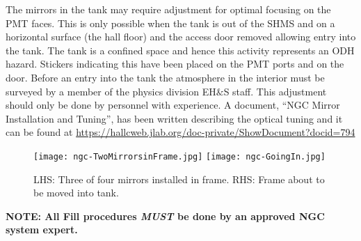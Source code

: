 {The mirrors in the tank may require adjustment for optimal focusing on
the PMT faces. This is only possible when the tank is out of the SHMS
and on a horizontal surface (the hall floor) and the access door
removed allowing entry into the tank. The tank is a confined space and
hence this activity represents an ODH hazard. Stickers indicating this
have been placed on the PMT ports and on the door. Before an entry
into the tank the atmosphere in the interior must be surveyed by a
member of the physics division EH$\&$S staff.  This adjustment should
only be done by personnel with experience. A document, ``NGC Mirror
Installation and Tuning'', has been written describing the optical
tuning and it can be found at
\url{https://hallcweb.jlab.org/doc-private/ShowDocument?docid=794}

\begin{figure}[!h] %
   \centering
   \texttt{[image: ngc-TwoMirrorsinFrame.jpg]}
   \texttt{[image: ngc-GoingIn.jpg]}
   \caption{LHS: Three of four mirrors installed in frame. RHS: Frame
     about to be moved into tank.\label{fig:install}}

\end{figure}


\vspace{.25in}

\textbf{NOTE: All Fill procedures \emph{MUST} be done by an approved NGC system
expert.}

}
